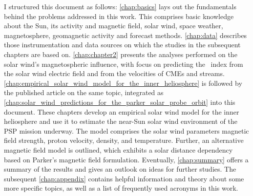 I structured this document as follows: \autoref{chap:basics} lays out the fundamentals behind the problems addressed in this work. This comprises basic knowledge about the Sun, its activity and magnetic field, solar wind, space weather, magnetosphere, geomagnetic activity and forecast methods. \autoref{chap:data} describes those instrumentation and data sources on which the studies in the subsequent chapters are based on. \autoref{chap:chapter2} presents the analyses performed on the solar wind's magnetospheric influence, with focus on predicting the \Kp~index from the solar wind electric field and from the velocities of CMEs and streams. \autoref{chap:empirical_solar_wind_model_for_the_inner_heliosphere} is followed by the published article on the same topic, integrated as \autoref{chap:solar_wind_predictions_for_the_parker_solar_probe_orbit} into this document. These chapters develop an empirical solar wind model for the inner heliosphere and use it to estimate the near-Sun solar wind environment of the PSP mission underway. The model comprises the solar wind parameters magnetic field strength, proton velocity, density, and temperature. Further, an alternative magnetic field model is outlined, which exhibits a solar distance dependency based on Parker's magnetic field formulation. Eventually, \autoref{chap:summary} offers a summary of the results and gives an outlook on ideas for further studies. The subsequent \autoref{chap:appendix} contains helpful information and theory about some more specific topics, as well as a list of frequently used acronyms in this work.



